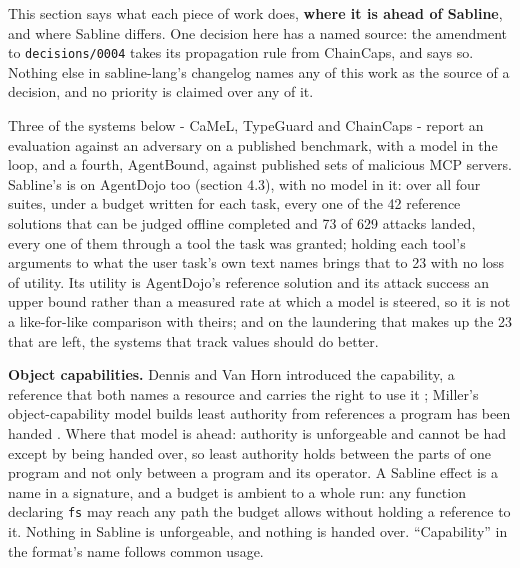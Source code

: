 \documentclass[
]{article}
\begin{document}
This section says what each piece of work does, \textbf{where it is
ahead of Sabline}, and where Sabline differs. One decision here has a
named source: the amendment to \texttt{decisions/0004} takes its
propagation rule from ChainCaps, and says so. Nothing else in
sabline-lang's changelog names any of this work as the source of a
decision, and no priority is claimed over any of it.

Three of the systems below - CaMeL, TypeGuard and ChainCaps - report an
evaluation against an adversary on a published benchmark, with a model
in the loop, and a fourth, AgentBound, against published sets of
malicious MCP servers. Sabline's is on AgentDojo too (section 4.3), with
no model in it: over all four suites, under a budget written for each
task, every one of the 42 reference solutions that can be judged offline
completed and 73 of 629 attacks landed, every one of them through a tool
the task was granted; holding each tool's arguments to what the user
task's own text names brings that to 23 with no loss of utility. Its
utility is AgentDojo's reference solution and its attack success an
upper bound rather than a measured rate at which a model is steered, so
it is not a like-for-like comparison with theirs; and on the laundering
that makes up the 23 that are left, the systems that track values should
do better.

\textbf{Object capabilities.} Dennis and Van Horn introduced the
capability, a reference that both names a resource and carries the right
to use it \citep{dennis1966semantics}; Miller's object-capability model
builds least authority from references a program has been handed
\citep{miller2006robust}. Where that model is ahead: authority is
unforgeable and cannot be had except by being handed over, so least
authority holds between the parts of one program and not only between a
program and its operator. A Sabline effect is a name in a signature, and
a budget is ambient to a whole run: any function declaring \texttt{fs}
may reach any path the budget allows without holding a reference to it.
Nothing in Sabline is unforgeable, and nothing is handed over.
``Capability'' in the format's name follows common usage.
\end{document}
